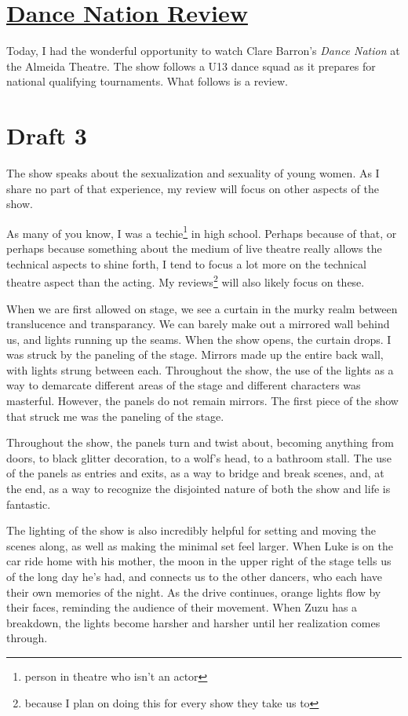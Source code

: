 \documentclass[12pt]{article}[titlepage]
\newcommand{\1}{\={a}}
\newcommand{\2}{\={e}}
\newcommand{\3}{\={\i}}
\newcommand{\4}{\=o}
\newcommand{\5}{\=u}
\newcommand{\6}{\={A}}
\renewcommand{\,}{\textsuperscript{,}}
\begin{document}
\doublespacing
\section{\href{dance-nation.html}{Dance Nation Review}}
Today, I had the wonderful opportunity to watch Clare Barron's \textit{Dance Nation} at the Almeida Theatre.
The show follows a U13 dance squad as it prepares for national qualifying tournaments.
What follows is a review.
\section{Draft 3}
The show speaks about the sexualization and sexuality of young women.
As I share no part of that experience, my review will focus on other aspects of the show.

As many of you know, I was a techie\footnote{person in theatre who isn't an actor} in high school.
Perhaps because of that, or perhaps because something about the medium of live theatre really allows the technical aspects to shine forth, I tend to focus a lot more on the technical theatre aspect than the acting.
My reviews\footnote{because I plan on doing this for every show they take us to} will also likely focus on these.

When we are first allowed on stage, we see a curtain in the murky realm between translucence and transparancy.
We can barely make out a mirrored wall behind us, and lights running up the seams.
When the show opens, the curtain drops.
I was struck by the paneling of the stage.
Mirrors made up the entire back wall, with lights strung between each.
Throughout the show, the use of the lights as a way to demarcate different areas of the stage and different characters was masterful.
However, the panels do not remain mirrors.
The first piece of the show that struck me was the paneling of the stage.

Throughout the show, the panels turn and twist about, becoming anything from doors, to black glitter decoration, to a wolf's head, to a bathroom stall.
The use of the panels as entries and exits, as a way to bridge and break scenes, and, at the end, as a way to recognize the disjointed nature of both the show and life is fantastic.

The lighting of the show is also incredibly helpful for setting and moving the scenes along, as well as making the minimal set feel larger.
When Luke is on the car ride home with his mother, the moon in the upper right of the stage tells us of the long day he's had, and connects us to the other dancers, who each have their own memories of the night.
As the drive continues, orange lights flow by their faces, reminding the audience of their movement.
When Zuzu has a breakdown, the lights become harsher and harsher until her realization comes through.
\end{document}
